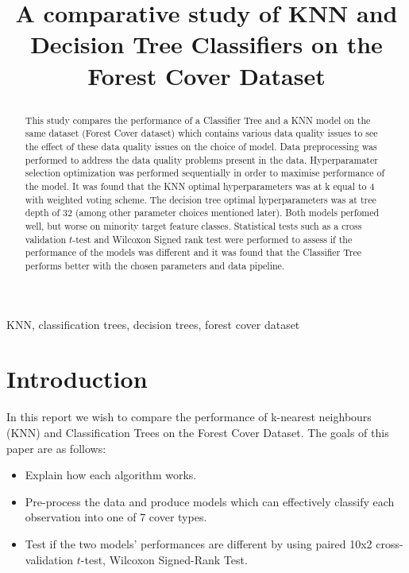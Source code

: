 \documentclass[conference]{IEEEtran}
\begin{document}
\title{A comparative study of KNN and Decision Tree Classifiers on the Forest Cover Dataset\\
{\footnotesize}

}

\author{
}


\maketitle

\begin{abstract}
This study compares the performance of a Classifier Tree and a KNN model on the same dataset (Forest Cover dataset) which contains various data quality issues to see the effect of these data quality issues on the choice of model. Data preprocessing was performed to address the data quality problems present in the data. Hyperparamater selection optimization was performed sequentially in order to maximise performance of the model. It was found that the KNN optimal hyperparameters was at k equal to 4 with weighted voting scheme. The decision tree optimal hyperparameters was at tree depth of 32 (among other parameter choices mentioned later). Both models perfomed well, but worse on minority target feature classes. Statistical tests such as a cross validation $t$-test and Wilcoxon Signed rank test were performed to assess if the performance of the models was different and it was found that the Classifier Tree performs better with the chosen parameters and data pipeline.
\end{abstract}

\begin{IEEEkeywords}
KNN, classification trees, decision trees, forest cover dataset
\end{IEEEkeywords}

\section{Introduction}

In this report we wish to compare the performance of k-nearest neighbours (KNN) and Classification Trees on the Forest Cover Dataset. The goals of this paper are as follows:
\begin{itemize}
	\item Explain how each algorithm works.
	\item Pre-process the data and produce models which can effectively classify each observation into one of 7 cover types.
	\item Test if the two models' performances are different by using paired 10x2 cross-validation $t$-test, Wilcoxon Signed-Rank Test.
\end{itemize}
\end{document}
